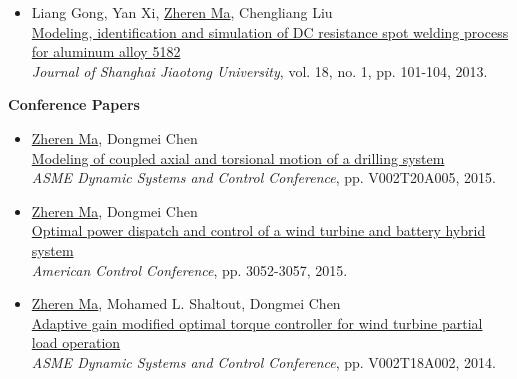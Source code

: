 \documentclass[margin, 9pt]{res} %
\begin{document}
\begin{resume}
\begin{itemize}[leftmargin=*]
\item Liang Gong, Yan Xi, \underline{Zheren Ma}, Chengliang Liu\\
          \href{http://link.springer.com/article/10.1007\%2Fs12204-013-1371-8}
          {Modeling, identification and simulation of DC resistance spot welding process for aluminum alloy 5182}\\
          \textit{Journal of Shanghai Jiaotong University}, vol. 18, no. 1, pp. 101-104, 2013.
\end{itemize}

{\large\textbf{Conference Papers}}
\begin{itemize}[leftmargin=*] \itemsep 0pt
	\item \underline{Zheren Ma}, Dongmei Chen\\
          \href{http://proceedings.asmedigitalcollection.asme.org/proceeding.aspx?articleid=2481922}{Modeling of coupled axial and torsional motion of a drilling system}\\
          \textit{ASME Dynamic Systems and Control Conference}, pp. V002T20A005, 2015.

	\item \underline{Zheren Ma},  Dongmei Chen\\
          \href{http://ieeexplore.ieee.org/xpl/login.jsp?tp=&arnumber=7171801&url=http\%3A\%2F\%2Fieeexplore.ieee.org\%2Fxpls\%2Fabs_all.jsp\%3Farnumber\%3D7171801}
          {Optimal power dispatch and control of a wind turbine and battery hybrid system}\\
          \textit{American Control Conference}, pp. 3052-3057, 2015.

	\item \underline{Zheren Ma}, Mohamed L. Shaltout, Dongmei Chen\\
          \href{http://proceedings.asmedigitalcollection.asme.org/proceeding.aspx?articleid=2086149}
          {Adaptive gain modified optimal torque controller for wind turbine partial load operation}\\
          \textit{ASME Dynamic Systems and Control Conference}, pp. V002T18A002, 2014.


\end{itemize}
\end{resume}
\end{document}
